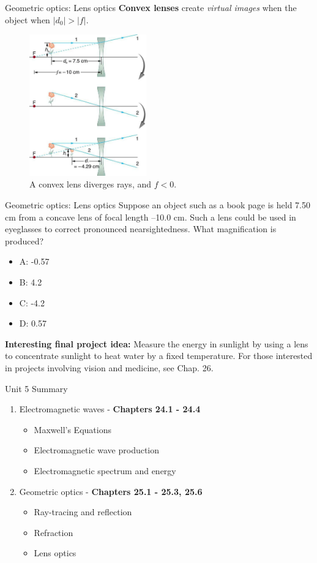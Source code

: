 \documentclass{beamer}
\begin{document}
\begin{frame}{Geometric optics: Lens optics}
\small
\textbf{\alert{Convex lenses}} create \textit{virtual images} when the object when $|d_0| > |f|$. 
\begin{figure}
\centering
\includegraphics[width=0.45\textwidth]{figures/lens3.png}
\caption{\label{fig:lens5} \small A convex lens diverges rays, and $f < 0$.}
\end{figure}
\end{frame}

\begin{frame}{Geometric optics: Lens optics}
\small
Suppose an object such as a book page is held 7.50 cm from a concave lens of focal length –10.0 cm. Such a lens could be used in eyeglasses to correct pronounced nearsightedness. What magnification is produced?
\begin{itemize}
\item A: -0.57
\item B: 4.2
\item C: -4.2
\item D: 0.57
\end{itemize}
\vspace{0.25cm}
\textbf{\alert{Interesting final project idea:}} Measure the energy in sunlight by using a lens to concentrate sunlight to heat water by a fixed temperature.  For those interested in projects involving vision and medicine, see Chap. 26.
\end{frame}

\begin{frame}{Unit 5 Summary}
\begin{enumerate}
\item Electromagnetic waves - \textbf{Chapters 24.1 - 24.4}
\begin{itemize}
\item Maxwell's Equations
\item Electromagnetic wave production
\item Electromagnetic spectrum and energy
\end{itemize}
\item Geometric optics - \textbf{Chapters 25.1 - 25.3, 25.6}
\begin{itemize}
\item Ray-tracing and reflection
\item Refraction
\item Lens optics
\end{itemize}
\end{enumerate}
\end{frame}
\end{document}
